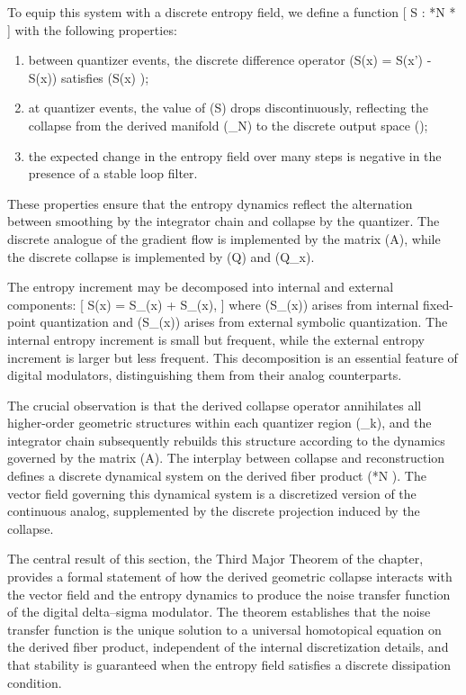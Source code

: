 To equip this system with a discrete entropy field, we define a function
[
S : *N \longrightarrow {}*{}
]
with the following properties:
\begin{enumerate}
\item between quantizer events, the discrete difference operator (\Delta S(x) = S(x') - S(x)) satisfies (\Delta S(x) );
\item at quantizer events, the value of (S) drops discontinuously, reflecting the collapse from the derived manifold (_N) to the discrete output space (\Lambda);
\item the expected change in the entropy field over many steps is negative in the presence of a stable loop filter.
\end{enumerate}
These properties ensure that the entropy dynamics reflect the alternation between smoothing by the integrator chain and collapse by the quantizer. The discrete analogue of the gradient flow is implemented by the matrix (A), while the discrete collapse is implemented by (Q) and (Q_x).

The entropy increment may be decomposed into internal and external components:
[
\Delta S(x) = \Delta S_{}(x) + \Delta S_{}(x),
]
where (\Delta S_{}(x)) arises from internal fixed-point quantization and (\Delta S_{}(x)) arises from external symbolic quantization. The internal entropy increment is small but frequent, while the external entropy increment is larger but less frequent. This decomposition is an essential feature of digital modulators, distinguishing them from their analog counterparts.

The crucial observation is that the derived collapse operator annihilates all higher-order geometric structures within each quantizer region (\Omega_k), and the integrator chain subsequently rebuilds this structure according to the dynamics governed by the matrix (A). The interplay between collapse and reconstruction defines a discrete dynamical system on the derived fiber product (*N  \Lambda). The vector field governing this dynamical system is a discretized version of the continuous analog, supplemented by the discrete projection induced by the collapse.

The central result of this section, the Third Major Theorem of the chapter, provides a formal statement of how the derived geometric collapse interacts with the vector field and the entropy dynamics to produce the noise transfer function of the digital delta--sigma modulator. The theorem establishes that the noise transfer function is the unique solution to a universal homotopical equation on the derived fiber product, independent of the internal discretization details, and that stability is guaranteed when the entropy field satisfies a discrete dissipation condition.

